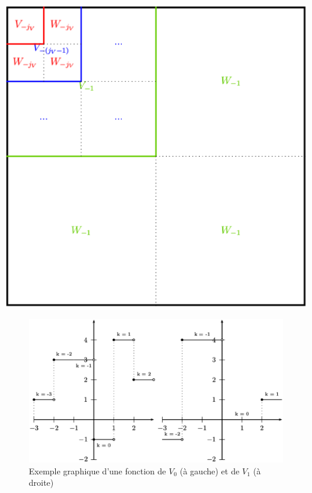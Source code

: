 \documentclass[10pt]{beamer}
\begin{document}
    \begin{frame}
      \centering
      \includegraphics[width = 0.7 \linewidth]{detail.eps}
    \end{frame}
    
    \begin{frame}
     \begin{figure}[!h]
	\centering
	\includegraphics[width = 0.7 \linewidth]{espaces.eps}
	\caption{Exemple graphique d'une fonction de $V_0$ (\`{a} gauche) et de $V_1$ (\`{a} droite)}
      \end{figure}
    \end{frame}
\end{document}
